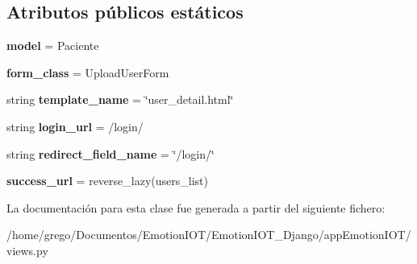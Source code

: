 \subsection*{Atributos públicos estáticos}
\begin{DoxyCompactItemize}
\item 
{\bfseries model} = Paciente\hypertarget{classappEmotionIOT_1_1views_1_1Update__user_a48f8fec194b20b9b6ef200b8191b9d94}{}\label{classappEmotionIOT_1_1views_1_1Update__user_a48f8fec194b20b9b6ef200b8191b9d94}

\item 
{\bfseries form\+\_\+class} = Upload\+User\+Form\hypertarget{classappEmotionIOT_1_1views_1_1Update__user_a3307ddb467cc71b05ccf36984d668443}{}\label{classappEmotionIOT_1_1views_1_1Update__user_a3307ddb467cc71b05ccf36984d668443}

\item 
string {\bfseries template\+\_\+name} = \char`\"{}user\+\_\+detail.\+html\char`\"{}\hypertarget{classappEmotionIOT_1_1views_1_1Update__user_a0c231a9c7c9b9bd99bdfb1084b01b151}{}\label{classappEmotionIOT_1_1views_1_1Update__user_a0c231a9c7c9b9bd99bdfb1084b01b151}

\item 
string {\bfseries login\+\_\+url} = \textquotesingle{}/login/\textquotesingle{}\hypertarget{classappEmotionIOT_1_1views_1_1Update__user_aa3fa66a232ec14a73171c6c74af15606}{}\label{classappEmotionIOT_1_1views_1_1Update__user_aa3fa66a232ec14a73171c6c74af15606}

\item 
string {\bfseries redirect\+\_\+field\+\_\+name} = \char`\"{}/login/\char`\"{}\hypertarget{classappEmotionIOT_1_1views_1_1Update__user_ae3465a7b18c4e9823083181c6b273f40}{}\label{classappEmotionIOT_1_1views_1_1Update__user_ae3465a7b18c4e9823083181c6b273f40}

\item 
{\bfseries success\+\_\+url} = reverse\+\_\+lazy(\textquotesingle{}users\+\_\+list\textquotesingle{})\hypertarget{classappEmotionIOT_1_1views_1_1Update__user_aeb6070c2e38cd01518dde74406ae6ecc}{}\label{classappEmotionIOT_1_1views_1_1Update__user_aeb6070c2e38cd01518dde74406ae6ecc}

\end{DoxyCompactItemize}


La documentación para esta clase fue generada a partir del siguiente fichero\+:\begin{DoxyCompactItemize}
\item 
/home/grego/\+Documentos/\+Emotion\+I\+O\+T/\+Emotion\+I\+O\+T\+\_\+\+Django/app\+Emotion\+I\+O\+T/views.\+py\end{DoxyCompactItemize}

